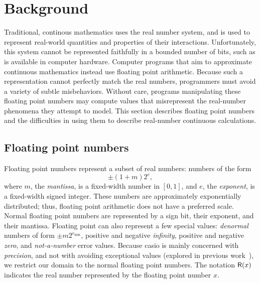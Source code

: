 \documentclass[paper.tex]{subfiles}
\begin{document}
\section{Background}

Traditional, continous mathematics uses the real number system,
  and is used to represent real-world quantities
  and properties of their interactions.
Unfortunately, this system cannot be represented faithfully
  in a bounded number of bits, 
  such as is available in computer hardware.
Computer programs that aim to approximate continuous mathematics
  instead use floating point arithmetic.
Because such a representation cannot perfectly match the real numbers,
  programmers must avoid a variety of subtle misbehaviors.
Without care, programs manipulating these floating point numbers
  may compute values that misrepresent
  the real-number phenomena they attempt to model.
This section describes floating point numbers
  and the difficulties in using them to describe
  real-number continuous calculations.

\subsection{Floating point numbers}

Floating point numbers represent a subset of real numbers:
  numbers of the form
\[ \pm (1 + m) 2^e, \]
  where $m$, the \emph{mantissa}, is a fixed-width number in $[0, 1]$,
  and $e$, the \emph{exponent}, is a fixed-width signed integer.
These numbers are approximately exponentially distributed;
  thus, floating point arithmetic does not have a preferred scale.
Normal floating point numbers are represented by
  a sign bit, their exponent, and their mantissa.
Floating point can also represent a few special values:
  \emph{denormal} numbers of form $\pm m 2^{e_{\text{min}}}$,
  positive and negative \emph{infinity}, positive and negative \emph{zero},
  and \emph{not-a-number} error values.
Because casio \casio is mainly concerned with \emph{precision},
  and not with avoiding exceptional values (explored in previous work~\cite{}),
  we restrict our domain to the normal floating point numbers.
The notation $\mathsf{R}(x)$ indicates the real number represented
  by the floating point number $x$.
\end{document}

